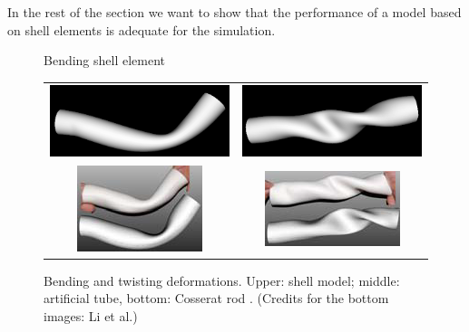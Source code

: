 In the rest of the section we want to show that the performance of a model
based on shell elements is adequate for the simulation.

\begin{figure}[tbh]
  \begin{minipage}[b]{0.3\linewidth}
      \framebox[1cm]{\rule{0pt}{1cm}}
      \caption{Bending shell element}
      \label{fig-shell}
  \end{minipage}
  \hspace{0.1\columnwidth}
  \begin{minipage}[b]{0.6\linewidth}
    \centering
    \begin{tabular}{cc}
     \includegraphics[width=0.5\columnwidth]{img/compare-bend.png}
      &
      \includegraphics[width=0.5\columnwidth]{img/compare-twist.png}
      \\
      \includegraphics[width=0.5\columnwidth]{img/compare-bend-other.png}
      &
      \includegraphics[width=0.5\columnwidth]{img/compare-twist-other.png}
    \end{tabular}
    \caption{Bending and twisting deformations. Upper: shell model; middle:
    artificial tube, bottom: Cosserat rod \cite{Li2009}. (Credits for the
    bottom images: Li et al.)}
    \label{fig-deformations}
  \end{minipage}
\end{figure}

